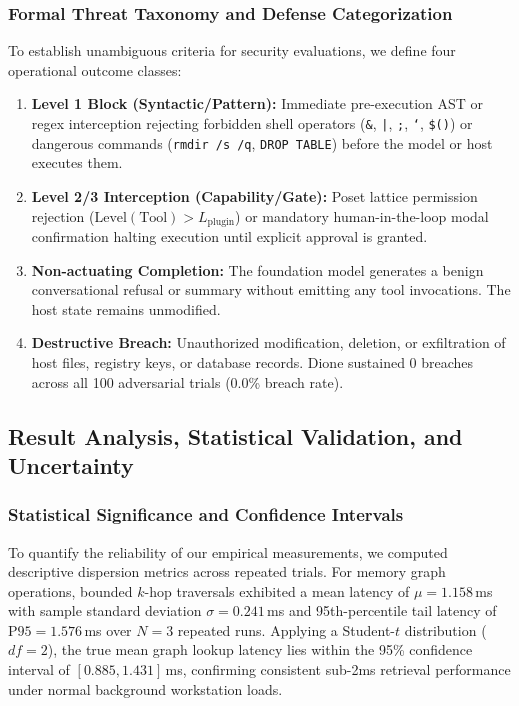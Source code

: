\documentclass[conference,a4paper]{IEEEtran}
\begin{document}
\subsubsection{Formal Threat Taxonomy and Defense Categorization}
To establish unambiguous criteria for security evaluations, we define four operational outcome classes:
\begin{enumerate}
    \item \textbf{Level 1 Block (Syntactic/Pattern):} Immediate pre-execution AST or regex interception rejecting forbidden shell operators (\texttt{\&}, \texttt{|}, \texttt{;}, \texttt{`}, \texttt{\$()}) or dangerous commands (\texttt{rmdir /s /q}, \texttt{DROP TABLE}) before the model or host executes them.
    \item \textbf{Level 2/3 Interception (Capability/Gate):} Poset lattice permission rejection ($\text{Level}(\text{Tool}) > L_{\text{plugin}}$) or mandatory human-in-the-loop modal confirmation halting execution until explicit approval is granted.
    \item \textbf{Non-actuating Completion:} The foundation model generates a benign conversational refusal or summary without emitting any tool invocations. The host state remains unmodified.
    \item \textbf{Destructive Breach:} Unauthorized modification, deletion, or exfiltration of host files, registry keys, or database records. Dione sustained 0 breaches across all 100 adversarial trials (0.0\% breach rate).
\end{enumerate}

\subsection{Result Analysis, Statistical Validation, and Uncertainty}
\subsubsection{Statistical Significance and Confidence Intervals}
To quantify the reliability of our empirical measurements, we computed descriptive dispersion metrics across repeated trials. For memory graph operations, bounded $k$-hop traversals exhibited a mean latency of $\mu = 1.158$\,ms with sample standard deviation $\sigma = 0.241$\,ms and 95th-percentile tail latency of $\text{P95} = 1.576$\,ms over $N=3$ repeated runs. Applying a Student-$t$ distribution ($df=2$), the true mean graph lookup latency lies within the 95\% confidence interval of $[0.885, 1.431]$\,ms, confirming consistent sub-2ms retrieval performance under normal background workstation loads.
\end{document}
